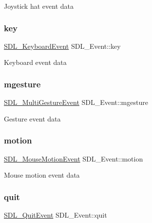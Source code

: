 Joystick hat event data \mbox{\label{union_s_d_l___event_ab99927835cc77a9b6bb50b419b4a27df}} 
\subsubsection{\texorpdfstring{key}{key}}
{\footnotesize\ttfamily \hyperlink{struct_s_d_l___keyboard_event}{S\+D\+L\+\_\+\+Keyboard\+Event} S\+D\+L\+\_\+\+Event\+::key}

Keyboard event data \mbox{\label{union_s_d_l___event_ac19b3c6a6b5181a51eb4fbe2cbe726a9}} 
\subsubsection{\texorpdfstring{mgesture}{mgesture}}
{\footnotesize\ttfamily \hyperlink{struct_s_d_l___multi_gesture_event}{S\+D\+L\+\_\+\+Multi\+Gesture\+Event} S\+D\+L\+\_\+\+Event\+::mgesture}

Gesture event data \mbox{\label{union_s_d_l___event_ac3c89e190faacbe84280cd539453bab6}} 
\subsubsection{\texorpdfstring{motion}{motion}}
{\footnotesize\ttfamily \hyperlink{struct_s_d_l___mouse_motion_event}{S\+D\+L\+\_\+\+Mouse\+Motion\+Event} S\+D\+L\+\_\+\+Event\+::motion}

Mouse motion event data \mbox{\label{union_s_d_l___event_a102a3008afe67a1c02ae7504e232dcef}} 
\subsubsection{\texorpdfstring{quit}{quit}}
{\footnotesize\ttfamily \hyperlink{struct_s_d_l___quit_event}{S\+D\+L\+\_\+\+Quit\+Event} S\+D\+L\+\_\+\+Event\+::quit}


